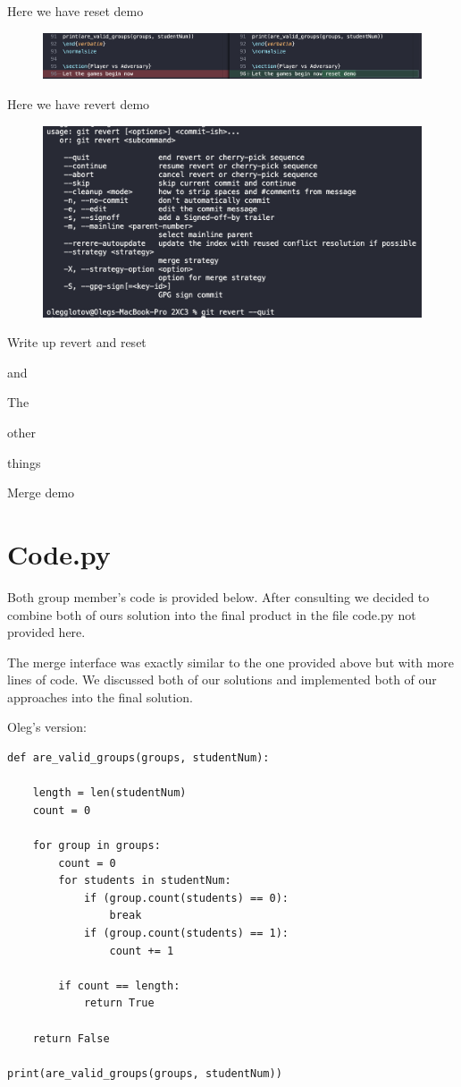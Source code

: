 \documentclass[twocolumn, 10pt]{article}
\begin{document}
Here we have reset demo

\begin{figure}[H]
\includegraphics[width=\linewidth]{reset}
\end{figure}

Here we have revert demo

\begin{figure}[H]
\includegraphics[width=\linewidth]{revert}
\end{figure}





Write up revert and reset

and

The

other 

things

Merge demo

\section{Code.py}

Both group member's code is provided below. After consulting we decided to combine both of ours solution into the final product in the file code.py not provided here.

The merge interface was exactly similar to the one provided above but with more lines of code. We discussed both of our solutions and implemented both of our approaches into the final solution.

Oleg's version:

\footnotesize
\begin{verbatim}
def are_valid_groups(groups, studentNum):

    length = len(studentNum)
    count = 0
    
    for group in groups:
        count = 0
        for students in studentNum:
            if (group.count(students) == 0):
                break
            if (group.count(students) == 1):
                count += 1
        
        if count == length:
            return True
        
    return False

print(are_valid_groups(groups, studentNum))
\end{verbatim}
\normalsize
\end{document}
